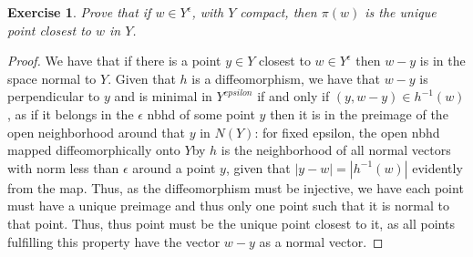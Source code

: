 \documentclass{article}
\newtheorem{exercise}{Exercise}
\begin{document}
    \begin{exercise}
      Prove that if $w \in Y^{\epsilon}$, with $Y$ compact, then $\pi(w)$ is the unique point closest to $w$ in $Y$. 
    \end{exercise}
    \begin{proof}
      We have that if there is a point $y \in Y$ closest to $w \in Y^{\epsilon}$ then $w-y$ is in the space normal to $Y$. Given that $h$ is a diffeomorphism, we have that $w-y$ is perpendicular to $y$ and is minimal in $Y^{epsilon}$ if and only if $(y,w-y) \in h^{-1}(w)$, as if it belongs in the $\epsilon$ nbhd of some point $y$ then it is in the preimage of the open neighborhood around that $y$ in $N(Y)$: for fixed epsilon, the open nbhd mapped diffeomorphically onto $Y$by $h$ is the neighborhood of all normal vectors with norm less than $\epsilon$ around a point $y$, given that $|y-w| = |h^{-1}(w)|$ evidently from the map. Thus, as the diffeomorphism must be injective, we have each point must have a unique preimage and thus only one point such that it is normal to that point. Thus, thus point must be the unique point closest to it, as all points fulfilling this property have the vector $w-y$ as a normal vector.
    \end{proof}

    \pagebreak

    
\end{document}

